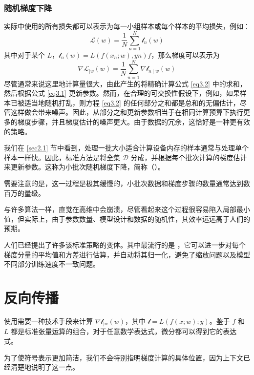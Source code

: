 \subsubsection*{随机梯度下降}

实际中使用的所有损失都可以表示为每一小组样本或每个样本的平均损失，例如：
\[\mathcal{L}(w) = \frac{1}{N} \sum_{n=1}^{N} \mathcal{l}_n(w)\]
其中对于某个 $L$，$\mathcal{l}_n(w) = L(f(x_n;w),yn) f$，那么梯度可以表示为
\begin{equation}
    \nabla \mathcal{L}_{\mid w}(w) = \frac{1}{N} \sum_{n=1}^{N} \nabla \mathcal{l}_{n \mid w}(w)\label{eq3.2}
\end{equation}
尽管通常来说这里地计算量很大，由此产生的将精确计算公式 \ref{eq3.2} 中的求和，然后根据公式 \ref{eq3.1} 更新参数。然而，在合理的可交换性假设下，例如，如果样本已被适当地随机打乱，则方程 \ref{eq3.2} 的任何部分之和都是总和的无偏估计，尽管这样做会带来噪声。因此，从部分之和更新参数相当于在相同计算预算下执行更多的梯度步骤，并且梯度估计的噪声更大。由于数据的冗余，这恰好是一种更有效的策略。

我们在 \ref{sec2.1} 节中看到，处理一批大小适合计算设备内存的样本通常与处理单个样本一样快。因此，标准方法是将全集 $\mathcal{D}$ 分成，并根据每个批次计算的梯度估计来更新参数。这称为小批次随机梯度下降，简称（）。

需要注意的是，这一过程是极其缓慢的，小批次数据和梯度步骤的数量通常达到数百万的量级。

与许多算法一样，直觉在高维中会崩溃，尽管看起来这个过程很容易陷入局部最小值，但实际上，由于参数数量、模型设计和数据的随机性，其效率远远高于人们的预期。

人们已经提出了许多该标准策略的变体。其中最流行的是 \citep{arxiv-1412.6980}，它可以进一步对每个梯度分量的平均值和方差进行估算，并自动将其归一化，避免了缩放问题以及模型不同部分训练速度不一致问题。

\section{反向传播}\label{sec3.4}

使用需要一种技术手段来计算 $\nabla \mathcal{l}_{\mid w}(w)$，其中 $\mathcal{l} = L(f(x;w);y)$。鉴于 $f$ 和 $L$ 都是标准张量运算的组合，对于任意数学表达式，微分都可以得到它的表达式。

为了使符号表示更加简洁，我们不会特别指明梯度计算的具体位置，因为上下文已经清楚地说明了这一点。

